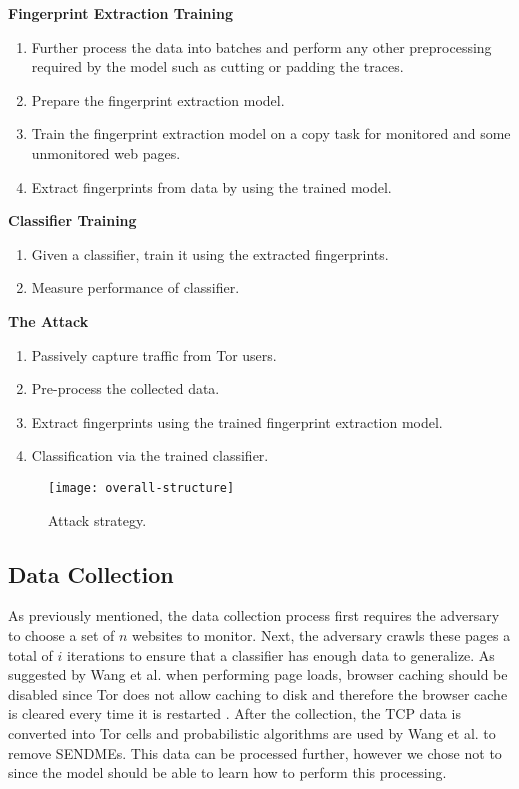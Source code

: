 \noindent
\textbf{Fingerprint Extraction Training}
\begin{enumerate}[resume]
  \item Further process the data into batches and perform any other preprocessing required by the model such as cutting or padding the traces.
  \item Prepare the fingerprint extraction model.
  \item Train the fingerprint extraction model on a copy task for monitored and some unmonitored web pages.
  \item Extract fingerprints from data by using the trained model.
\end{enumerate}

\noindent
\textbf{Classifier Training}
\begin{enumerate}[resume]
  \item Given a classifier, train it using the extracted fingerprints.
  \item Measure performance of classifier.
\end{enumerate}

\noindent
\textbf{The Attack}
\begin{enumerate}[resume]
  \item Passively capture traffic from Tor users.
  \item Pre-process the collected data.
  \item Extract fingerprints using the trained fingerprint extraction model.
  \item Classification via the trained classifier.
\end{enumerate}

\begin{figure}[ht]
  \centering
  \texttt{[image: overall-structure]}
  \caption{Attack strategy.}
  \label{fig:attack-strategy}
\end{figure}

\subsection{Data Collection} \label{sec:data_collection1}

As previously mentioned, the data collection process first requires the adversary to choose a set of $n$ websites to monitor.
Next, the adversary crawls these pages a total of $i$ iterations to ensure that a classifier has enough data to generalize.
As suggested by Wang et al. when performing page loads, browser caching should be disabled since Tor does not allow caching to disk and therefore the browser cache is cleared every time it is restarted \cite{wang_goldberg_2013}.
After the collection, the TCP data is converted into Tor cells and probabilistic algorithms are used by Wang et al. \cite{wang_goldberg_2013} to remove SENDMEs.
This data can be processed further, however we chose not to since the model should be able to learn how to perform this processing.


